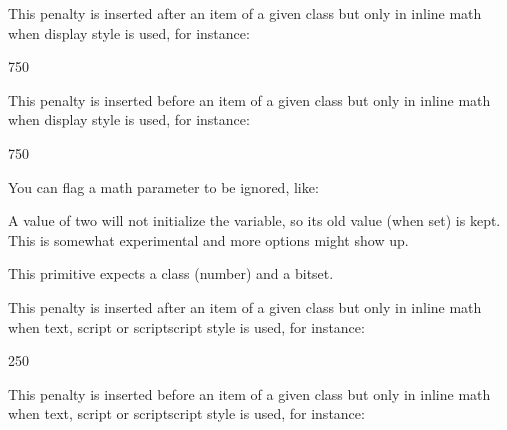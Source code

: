 \stopnewprimitive

\startnewprimitive[title={\prm {setmathdisplaypostpenalty}}]

This penalty is inserted after an item of a given class but only in inline math
when display style is used, for instance:

\starttyping
{} 750
\stoptyping

\stopnewprimitive

\startnewprimitive[title={\prm {setmathdisplayprepenalty}}]

This penalty is inserted before an item of a given class but only in inline math
when display style is used, for instance:

\starttyping
{} 750
\stoptyping

\stopnewprimitive

\startnewprimitive[title={\prm {setmathignore}}]

You can flag a math parameter to be ignored, like:

\starttyping
\setmathignore {}
\setmathignore {}
\setmathignore {}
\setmathignore {}
\setmathignore {}
\stoptyping

A value of two will not initialize the variable, so its old value (when set) is
kept. This is somewhat experimental and more options might show up.

\stopnewprimitive

\startnewprimitive[title={\prm {setmathoptions}}]

This primitive expects a class (number) and a bitset.

\testpage[2]

\starttworows
{}%
\stoptworows

\stopnewprimitive

\startnewprimitive[title={\prm {setmathpostpenalty}}]

This penalty is inserted after an item of a given class but only in inline math
when text, script or scriptscript style is used, for instance:

\starttyping
{} 250
\stoptyping

\stopnewprimitive

\startnewprimitive[title={\prm {setmathprepenalty}}]

This penalty is inserted before an item of a given class but only in inline math
when text, script or scriptscript style is used, for instance:


